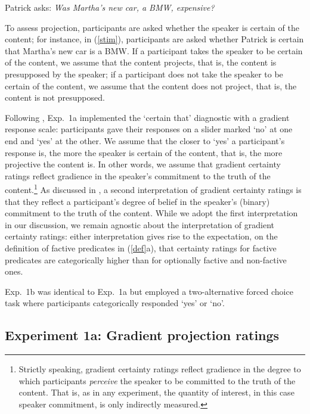 \documentclass[11pt,fleqn]{article}
\newcommand{\6}{\mbox{$[\hspace*{-.6mm}[$}}
\newcommand{\9}{\mbox{$]\hspace*{-.6mm}]$}}
\begin{document}
\begin{exe}

\ex\label{stim} Patrick asks: {\em Was Martha's new car, a BMW, expensive?} 

\end{exe}
To assess projection, participants are asked whether the speaker is certain of the content; for instance, in (\ref{stim}), participants are asked whether Patrick is certain that Martha's new car is a BMW. If a participant takes the speaker to be certain of the content, we assume that the content projects, that is, the content is presupposed by the speaker; if a participant does not take the speaker to be certain of the content, we assume that the content does not project, that is, the content is not presupposed.

Following \citealt{tbd-variability}, Exp.~1a implemented the `certain that' diagnostic with a gradient response scale: participants gave their responses on a slider marked `no' at one end and `yes' at the other. We assume that the closer to `yes' a participant's response is, the more the speaker is certain of the content, that is, the more projective the content is. In other words, we assume that gradient certainty ratings reflect gradience in the speaker's commitment to the truth of the content.\footnote{Strictly speaking,  gradient certainty ratings reflect gradience in the degree to which participants \emph{perceive} the speaker to be committed to the truth of the content. That is, as in any experiment, the quantity of interest, in this case speaker commitment, is only indirectly measured.} As discussed in \citealt{tbd-variability}, a second interpretation of gradient certainty ratings is that they reflect a participant's degree of belief in the speaker's (binary) commitment to the truth of the content. While we adopt the first interpretation in our discussion, we remain agnostic about the interpretation of gradient certainty ratings: either interpretation gives rise to the expectation,  on the definition of factive predicates in (\ref{def}a), that certainty ratings for factive predicates are categorically higher than for optionally factive and non-factive ones. 

Exp.~1b was identical to Exp.~1a but employed a two-alternative forced choice task where participants categorically responded `yes' or `no'.
 
\subsection{Experiment 1a: Gradient projection ratings}\label{s-exp1a}
\end{document}
